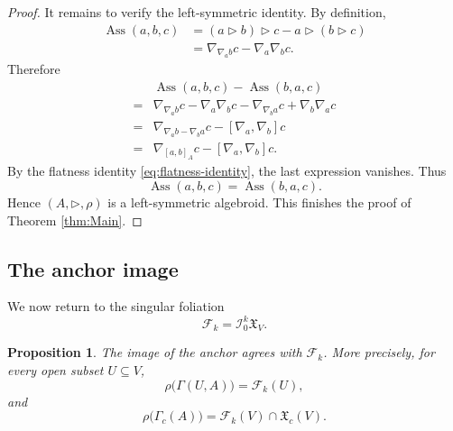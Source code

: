 \documentclass[12pt,reqno]{amsart}
\newtheorem{propn}[thm]{Proposition}
\theoremstyle{definition}
\theoremstyle{remark}
\begin{document}
\begin{proof}
It remains to verify the left-symmetric identity. By definition,
\[
\begin{aligned}
\operatorname{Ass}(a,b,c)
&=
(a\triangleright b)\triangleright c
-
a\triangleright(b\triangleright c)
\\
&=
\nabla_{\nabla_ab}c-\nabla_a\nabla_bc.
\end{aligned}
\]
Therefore
\[
\begin{aligned}
&\operatorname{Ass}(a,b,c)
-
\operatorname{Ass}(b,a,c)
\\
={}&
\nabla_{\nabla_ab}c
-
\nabla_a\nabla_bc
-
\nabla_{\nabla_ba}c
+
\nabla_b\nabla_ac
\\
={}&
\nabla_{\nabla_ab-\nabla_ba}c
-
[\nabla_a,\nabla_b]c
\\
={}&
\nabla_{[a,b]_A}c
-
[\nabla_a,\nabla_b]c.
\end{aligned}
\]
By the flatness identity \eqref{eq:flatness-identity}, the last
expression vanishes. Thus
\[
\operatorname{Ass}(a,b,c)
=
\operatorname{Ass}(b,a,c).
\]
Hence \((A,\triangleright,\rho)\) is a left-symmetric algebroid. This finishes the proof of Theorem \ref{thm:Main}.
\end{proof}

\subsection{The anchor image}

We now return to the singular foliation
\[
\mathcal F_k
=
\mathcal I_0^k\mathfrak X_V.
\]

\begin{propn}
The image of the anchor agrees with \(\mathcal F_k\). More precisely, for
every open subset \(U\subseteq V\),
\begin{equation}
\rho\bigl(\Gamma(U,A)\bigr)
=
\mathcal F_k(U),
\label{eq:sheaf-anchor-image}
\end{equation}
and
\begin{equation}
\rho\bigl(\Gamma_c(A)\bigr)
=
\mathcal F_k(V)\cap\mathfrak X_c(V).
\label{eq:compact-anchor-image}
\end{equation}
\end{propn}
\end{document}
